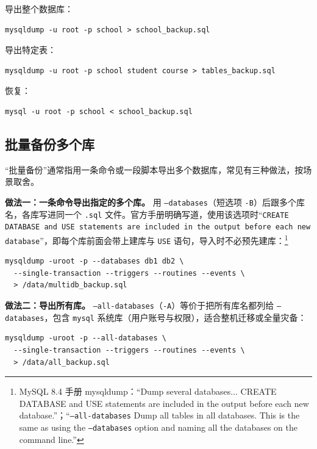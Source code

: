 \documentclass[12pt,UTF8]{ctexbook}
\begin{document}
导出整个数据库：

\begin{lstlisting}
mysqldump -u root -p school > school_backup.sql
\end{lstlisting}

导出特定表：

\begin{lstlisting}
mysqldump -u root -p school student course > tables_backup.sql
\end{lstlisting}

恢复：

\begin{lstlisting}
mysql -u root -p school < school_backup.sql
\end{lstlisting}

\subsection{批量备份多个库}
\label{sec:batch-backup}

“批量备份”通常指用一条命令或一段脚本导出多个数据库，常见有三种做法，按场景取舍。

\textbf{做法一：一条命令导出指定的多个库。} 用 \texttt{--databases}（短选项 \texttt{-B}）后跟多个库名，各库写进同一个 \texttt{.sql} 文件。官方手册明确写道，使用该选项时“\texttt{CREATE DATABASE and USE statements are included in the output before each new database}”，即每个库前面会带上建库与 \texttt{USE} 语句，导入时不必预先建库：\footnote{MySQL 8.4 手册 mysqldump：“Dump several databases... CREATE DATABASE and USE statements are included in the output before each new database.”；“\texttt{--all-databases} Dump all tables in all databases. This is the same as using the \texttt{--databases} option and naming all the databases on the command line.”}

\begin{lstlisting}
mysqldump -uroot -p --databases db1 db2 \
  --single-transaction --triggers --routines --events \
  > /data/multidb_backup.sql
\end{lstlisting}

\textbf{做法二：导出所有库。} \texttt{--all-databases}（\texttt{-A}）等价于把所有库名都列给 \texttt{--databases}，包含 \texttt{mysql} 系统库（用户账号与权限），适合整机迁移或全量灾备：

\begin{lstlisting}
mysqldump -uroot -p --all-databases \
  --single-transaction --triggers --routines --events \
  > /data/all_backup.sql
\end{lstlisting}
\end{document}
